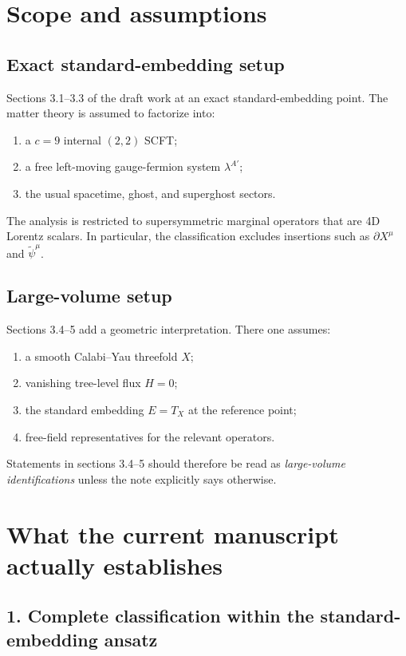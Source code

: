 \documentclass[11pt]{article}
\newcommand{\wt}[1]{\widetilde{#1}}
\begin{document}
\section{Scope and assumptions}

\subsection*{Exact standard-embedding setup}

Sections 3.1--3.3 of the draft work at an exact standard-embedding point. The matter theory is assumed to factorize into:
\begin{enumerate}
\item a $c=9$ internal $(2,2)$ SCFT;
\item a free left-moving gauge-fermion system $\lambda^{A'}$;
\item the usual spacetime, ghost, and superghost sectors.
\end{enumerate}

The analysis is restricted to supersymmetric marginal operators that are 4D Lorentz scalars. In particular, the classification excludes insertions such as $\partial X^\mu$ and $\wt\psi^\mu$.

\subsection*{Large-volume setup}

Sections 3.4--5 add a geometric interpretation. There one assumes:
\begin{enumerate}
\item a smooth Calabi--Yau threefold $X$;
\item vanishing tree-level flux $H=0$;
\item the standard embedding $E=T_X$ at the reference point;
\item free-field representatives for the relevant operators.
\end{enumerate}

Statements in sections 3.4--5 should therefore be read as \emph{large-volume identifications} unless the note explicitly says otherwise.

\section{What the current manuscript actually establishes}

\subsection*{1. Complete classification within the standard-embedding ansatz}
\end{document}
